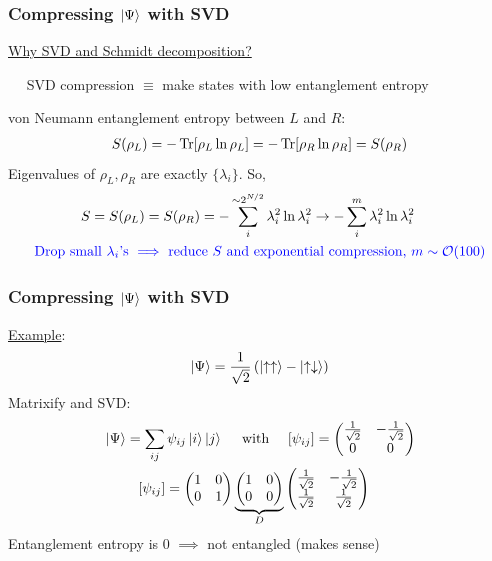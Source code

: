 \documentclass{beamer}
\theoremstyle{definition}
\newcommand{\lp}{\left(}
\newcommand{\rp}{\right)}
\newcommand{\f}[2]{\frac{#1}{#2}}
\begin{document}
\begin{frame}
	\frametitle{Compressing $\ket{\Psi}$ with SVD}
	
	\underline{Why SVD and Schmidt decomposition?} \\
	
	\vspace{8pt}
	
	$\quad$ SVD compression $\equiv$ make states with low entanglement entropy\\
	
	\vspace{8pt}
	
	von Neumann entanglement entropy between $L$ and $R$:
	\begin{align*}
		S(\rho_L) = -\Tr[\rho_L \ln \rho_L] = -\Tr[\rho_R \ln \rho_R] = S(\rho_R) 
	\end{align*}
	Eigenvalues of $\rho_L, \rho_R$ are exactly $\{\lambda_i\}$. So,
	\vspace{-7pt}
	\begin{align*}
		&\quad\quad \quad \,\, S = S(\rho_L) = S(\rho_R) = -\sum_i^{\sim 2^{N/2}} \lambda_i^2 \ln \lambda_i^2 \to -\sum_i^m \lambda_i^2 \ln \lambda_i^2\\
		&\text{\textcolor{blue}{Drop small $\lambda_i$'s $\implies$ reduce $S$ and exponential compression, $m\sim \mathcal{O}(100)$}}
	\end{align*}
	
\end{frame}


\begin{frame}
	\frametitle{Compressing $\ket{\Psi}$ with SVD}
	
	\underline{Example}:  
	\begin{align*}
		\ket{\Psi} = \f{1}{\sqrt{2}}\lp \ket{\uparrow\uparrow} - \ket{\uparrow\downarrow} \rp
	\end{align*}
	Matrixify and SVD:
	\begin{align*}
	&\ket{\Psi} = \sum_{ij}\psi_{ij}\ket{i}\ket{j} \quad \text{ with } \quad   [\psi_{ij}] = \begin{pmatrix}
			\f{1}{\sqrt{2}} & -\f{1}{\sqrt{2}} \\ 0 & 0
		\end{pmatrix}\\
	&\quad\quad \,\,\,[\psi_{ij}] = \begin{pmatrix}
			1 & 0 \\ 0 & 1
		\end{pmatrix}
	\underbrace{\begin{pmatrix}
		1 & 0 \\ 0 & 0 
	\end{pmatrix}}_D
	\begin{pmatrix}
		\f{1}{\sqrt{2}} & -\f{1}{\sqrt{2}} \\ 	\f{1}{\sqrt{2}} & \f{1}{\sqrt{2}}
	\end{pmatrix}
	\end{align*}
	Entanglement entropy is 0 $\implies$ not entangled (makes sense)
\end{frame}
\end{document}
